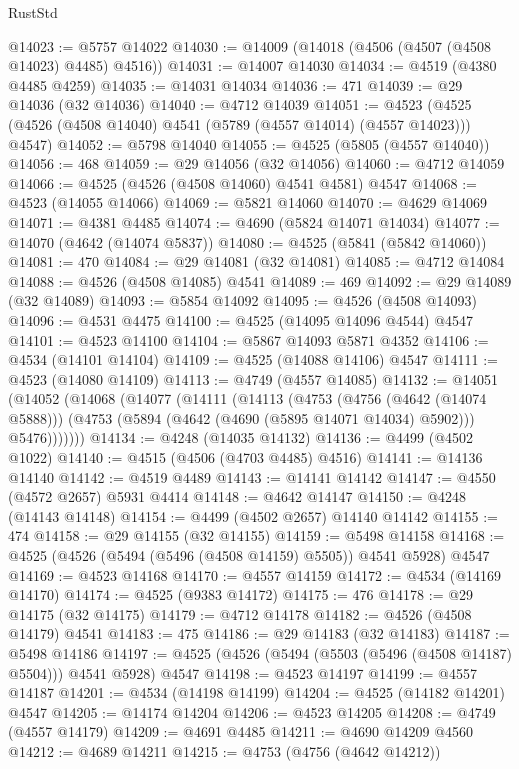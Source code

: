 \begin{lexlean}{RustStd}
\begin{coremodule}
{\begin{coremodule}
{{{{{{{{{{{{{{{{{{{{{{{{{{{{{{{{{{{{{{{{{{{{{{{{{{{{{{{@14023 := @5757 @14022
@14030 := @14009 (@14018 (@4506 (@4507 (@4508 @14023) @4485) @4516))
@14031 := @14007 @14030
@14034 := @4519 (@4380 @4485 @4259)
@14035 := @14031 @14034
@14036 := 471
@14039 := @29 @14036 (@32 @14036)
@14040 := @4712 @14039
@14051 := @4523 (@4525 (@4526 (@4508 @14040) @4541 (@5789 (@4557 @14014) (@4557 @14023))) @4547)
@14052 := @5798 @14040
@14055 := @4525 (@5805 (@4557 @14040))
@14056 := 468
@14059 := @29 @14056 (@32 @14056)
@14060 := @4712 @14059
@14066 := @4525 (@4526 (@4508 @14060) @4541 @4581) @4547
@14068 := @4523 (@14055 @14066)
@14069 := @5821 @14060
@14070 := @4629 @14069
@14071 := @4381 @4485
@14074 := @4690 (@5824 @14071 @14034)
@14077 := @14070 (@4642 (@14074 @5837))
@14080 := @4525 (@5841 (@5842 @14060))
@14081 := 470
@14084 := @29 @14081 (@32 @14081)
@14085 := @4712 @14084
@14088 := @4526 (@4508 @14085) @4541
@14089 := 469
@14092 := @29 @14089 (@32 @14089)
@14093 := @5854 @14092
@14095 := @4526 (@4508 @14093)
@14096 := @4531 @4475
@14100 := @4525 (@14095 @14096 @4544) @4547
@14101 := @4523 @14100
@14104 := @5867 @14093 @5871 @4352
@14106 := @4534 (@14101 @14104)
@14109 := @4525 (@14088 @14106) @4547
@14111 := @4523 (@14080 @14109)
@14113 := @4749 (@4557 @14085)
@14132 := @14051
    (@14052
      (@14068
        (@14077
          (@14111
            (@14113
              (@4753
                (@4756 (@4642 (@14074 @5888)))
                (@4753 (@5894 (@4642 (@4690 (@5895 @14071 @14034) @5902))) @5476)))))))
@14134 := @4248 (@14035 @14132)
@14136 := @4499 (@4502 @1022)
@14140 := @4515 (@4506 (@4703 @4485) @4516)
@14141 := @14136 @14140
@14142 := @4519 @4489
@14143 := @14141 @14142
@14147 := @4550 (@4572 @2657) @5931 @4414
@14148 := @4642 @14147
@14150 := @4248 (@14143 @14148)
@14154 := @4499 (@4502 @2657) @14140 @14142
@14155 := 474
@14158 := @29 @14155 (@32 @14155)
@14159 := @5498 @14158
@14168 := @4525 (@4526 (@5494 (@5496 (@4508 @14159) @5505)) @4541 @5928) @4547
@14169 := @4523 @14168
@14170 := @4557 @14159
@14172 := @4534 (@14169 @14170)
@14174 := @4525 (@9383 @14172)
@14175 := 476
@14178 := @29 @14175 (@32 @14175)
@14179 := @4712 @14178
@14182 := @4526 (@4508 @14179) @4541
@14183 := 475
@14186 := @29 @14183 (@32 @14183)
@14187 := @5498 @14186
@14197 := @4525 (@4526 (@5494 (@5503 (@5496 (@4508 @14187) @5504))) @4541 @5928) @4547
@14198 := @4523 @14197
@14199 := @4557 @14187
@14201 := @4534 (@14198 @14199)
@14204 := @4525 (@14182 @14201) @4547
@14205 := @14174 @14204
@14206 := @4523 @14205
@14208 := @4749 (@4557 @14179)
@14209 := @4691 @4485
@14211 := @4690 @14209 @4560
@14212 := @4689 @14211
@14215 := @4753 (@4756 (@4642 @14212))
}}}}}}}}}}}}}}}}}}}}}}}}}}}}}}}}}}}}}}}}}}}}}}}}}}}}}}}
\end{coremodule}}
\end{coremodule}
\end{lexlean}
